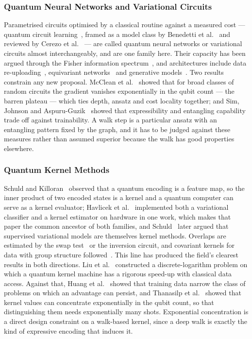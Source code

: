 \subsubsection{Quantum Neural Networks and Variational Circuits}
\label{sec:lr-qnn}
Parametrised circuits optimised by a classical routine against a measured
cost --- quantum circuit learning~\cite{Mitarai_2018}, framed as a model
class by Benedetti et al.~\cite{Benedetti_2019} and reviewed by Cerezo et
al.~\cite{Cerezo_2021} --- are called quantum neural networks or variational
circuits almost interchangeably, and are one family here. Their capacity has
been argued through the Fisher information spectrum~\cite{Abbas_2021}, and
architectures include data re-uploading~\cite{PrezSalinas_2019}, equivariant
networks~\cite{Nguyen_2024} and generative models~\cite{Gao_2018}. Two
results constrain any new proposal. McClean et al.~\cite{McClean_2018} showed
that for broad classes of random circuits the gradient vanishes exponentially
in the qubit count --- the barren plateau --- which ties depth, ansatz and
cost locality together; and Sim, Johnson and Aspuru-Guzik~\cite{Sim_2019}
showed that expressibility and entangling capability trade off against
trainability. A walk step is a particular ansatz with an entangling pattern
fixed by the graph, and it has to be judged against these measures rather
than assumed superior because the walk has good properties elsewhere.

\subsubsection{Quantum Kernel Methods}
\label{sec:lr-qkernel}
Schuld and Killoran~\cite{Schuld_2018} observed that a quantum encoding is a
feature map, so the inner product of two encoded states is a kernel and a
quantum computer can serve as a kernel evaluator; Havlicek et
al.~\cite{Havlicek_2019} implemented both a variational classifier and a
kernel estimator on hardware in one work, which makes that paper the common
ancestor of both families, and Schuld~\cite{Schuld_2021} later argued that
supervised variational models are themselves kernel methods. Overlaps are
estimated by the swap test~\cite{Buhrman_2001} or the inversion circuit, and
covariant kernels for data with group structure followed~\cite{Glick_2021}.
This line has produced the field's clearest results in both directions. Liu
et al.~\cite{Liu_2020} constructed a discrete-logarithm problem on which a
quantum kernel machine has a rigorous speed-up with classical data access.
Against that, Huang et al.~\cite{Huang_2021} showed that training data narrow
the class of problems on which an advantage can persist, and Thanasilp et
al.~\cite{Thanasilp_2024} showed that kernel values can concentrate
exponentially in the qubit count, so that distinguishing them needs
exponentially many shots. Exponential concentration is a direct design
constraint on a walk-based kernel, since a deep walk is exactly the kind of
expressive encoding that induces it.

